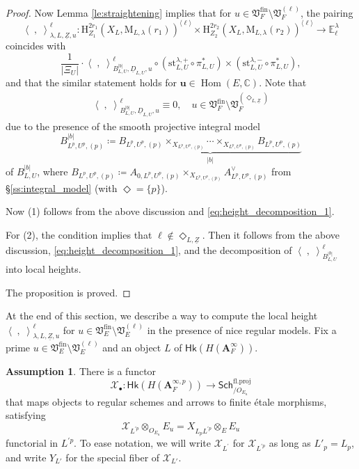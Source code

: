 \documentclass[12pt]{amsart}
\numberwithin{equation}{section}
\theoremstyle{plain}
\theoremstyle{definition}
\newtheorem{assumption}[proposition]{Assumption}
\theoremstyle{remark}
\renewcommand{\b}[1]{\mathbf{#1}}
\renewcommand{\c}[1]{\mathcal{#1}}
\renewcommand{\d}[1]{\mathbb{#1}}
\newcommand{\f}[1]{\mathfrak{#1}}
\renewcommand{\r}[1]{\mathrm{#1}}
\renewcommand{\sf}[1]{\mathsf{#1}}
\renewcommand{\(}{\left(}
\renewcommand{\)}{\right)}
\newcommand{\ang}[1]{\langle{#1}\rangle}
\newcommand{\ul}{\underline}
\newcommand{\bA}{\b A}
\newcommand{\cX}{\c X}
\newcommand{\dC}{\d C}
\newcommand{\dE}{\d E}
\newcommand{\fV}{\f V}
\newcommand{\rH}{\r H}
\newcommand{\rM}{\r M}
\newcommand{\bbu}{\boldsymbol{u}}
\newcommand{\llangle}{\left\langle}
\newcommand{\rrangle}{\right\rangle}
\newcommand{\fin}{\r{fin}}
\newcommand{\proj}{\r{fl.proj}}
\newcommand{\st}{\r{st}}
\newcommand{\Sch}{\sf{Sch}}
\newcommand{\Hk}{\sf{Hk}}
\DeclareMathOperator{\Hom}{Hom}
\begin{document}
\begin{proof}
Now Lemma \ref{le:straightening} implies that for $u\in\fV_F^\fin\setminus\fV_F^{(\ell)}$, the pairing
\[
\llangle\;,\;\rrangle_{\lambda,L,\ul{Z},u}^\ell\colon
\rH^{2r_1}_{Z_1}(X_L,\rM_{L,\lambda}(r_1))^{\ang\ell}\times\rH^{2r_2}_{Z_2}(X_L,\rM_{L,\lambda}(r_2))^{\ang\ell}
\to\dE^\lambda_\ell
\]
coincides with
\[
\frac{1}{|\Xi_U|}\cdot \llangle\;,\;\rrangle_{B_{L,U}^{|b|},\ul{D}_{L,U},u}^\ell \circ
(\st_{L,U}^{\lambda,+}\circ\pi_{L,U}^*)\times(\st_{L,U}^{\lambda,-}\circ\pi_{L,U}^*),
\]
and that the similar statement holds for $\bbu\in\Hom(E,\dC)$. Note that
\begin{align}\label{eq:height_decomposition_1}
\llangle\;,\;\rrangle_{B_{L,U}^{|b|},\ul{D}_{L,U},u}^\ell \equiv 0, \quad u\in\fV_F^\fin\setminus\fV_F^{(\Diamond_{L,\ul{Z}})}
\end{align}
due to the presence of the smooth projective integral model
\[
B_{L^p,U^p,(p)}^{|b|}\coloneqq
\underbrace{B_{L^p,U^p,(p)}\times_{X_{L^p,U^p,(p)}}\cdots\times_{X_{L^p,U^p,(p)}}B_{L^p,U^p,(p)}}_{|b|}
\]
of $B_{L,U}^{|b|}$, where $B_{L^p,U^p,(p)}\coloneqq A_{0,L^p,U^p,(p)}\times_{X_{L^p,U^p,(p)}}A_{L^p,U^p,(p)}^\vee$ from \S\ref{ss:integral_model} (with $\Diamond=\{p\}$).


Now (1) follows from the above discussion and \eqref{eq:height_decomposition_1}.

For (2), the condition implies that $\ell\not\in\Diamond_{L,\ul{Z}}$. Then it follows from the above discussion, \eqref{eq:height_decomposition_1}, and the decomposition of $\llangle\;,\;\rrangle_{B_{L,U}^{|b|}}^\ell$ into local heights.

The proposition is proved.
\end{proof}




At the end of this section, we describe a way to compute the local height $\llangle\;,\;\rrangle_{\lambda,L,\ul{Z},u}^{\ell}$ for $u\in\fV_E^\fin\setminus\fV_E^{(\ell)}$ in the presence of nice regular models. Fix a prime $u\in\fV_E^\fin\setminus\fV_E^{(\ell)}$ and an object $L$ of $\Hk(H(\bA_F^\infty))$.

\begin{assumption}\label{as:integral_model}
There is a functor
\[
\cX_\bullet\colon \Hk(H(\bA_F^{\infty,p}))\to\Sch^\proj_{/O_{E_u}}
\]
that maps objects to regular schemes and arrows to finite \'{e}tale morphisms, satisfying
\[
\cX_{L^{\prime p}}\otimes_{O_{E_u}}E_u=X_{L_pL^{\prime p}}\otimes_EE_u
\]
functorial in $L^{\prime p}$. To ease notation, we will write $\cX_{L^\prime}$ for $\cX_{L^{\prime p}}$ as long as $L'_p=L_p$, and write $Y_{L'}$ for the special fiber of $\cX_{L'}$.
\end{assumption}
\end{document}
